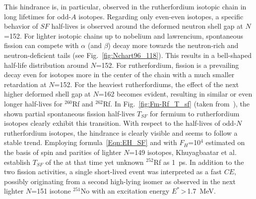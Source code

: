 This hindrance is, in particular, observed in the rutherfordium isotopic chain in long lifetimes for odd-$A$ isotopes. 
Regarding only even-even isotopes, a specific behavior of $SF$ half-lives is observed around the deformed neutron shell gap at $N$=152. 
For lighter isotopic chains up to nobelium and lawrencium, spontaneous fission can compete with $\alpha$ (and $\beta$) decay more towards the neutron-rich and neutron-deficient tails (see Fig.~\ref{fig:Nchart96_118}). 
This results in a bell-shaped half-life distribution around $N$=152. 
For rutherfordium, fission is a prevailing decay even for isotopes more in the center of the chain with a much smaller retardation at $N$=152. 
For the heaviest rutherfordiums, the effect of the next higher deformed shell gap at $N$=162 becomes evident, resulting in similar or even longer half-lives for $^{260}$Rf and $^{262}$Rf. 
In Fig.~\ref{fig:Fm-Rf_T_sf} (taken from~\cite{Khuyagbaatar2021}), the shown partial spontaneous fission half-lives $T_{SF}$ for fermium to rutherfordium isotopes clearly exhibit this transition. 
With respect to the half-lives of odd-$N$ rutherfordium isotopes, the hindrance is clearly visible and seems to follow a stable trend. 
Employing formula~\ref{Eqn:EH_SF} and with $F_H$=10$^4$ estimated on the basis of spin and parities of lighter $N$=149 isotopes, Khuyagbaatar et al. establish $T_{SF}$ of the at that time yet unknown $^{252}$Rf as 1~ps. 
In addition to the two fission activities, a single short-lived event was interpreted as a fast $CE$, possibly originating from a second high-lying isomer as observed in the next lighter $N$=151 isotone $^{251}$No with an excitation energy $E^*$\,>\,1.7~MeV.

